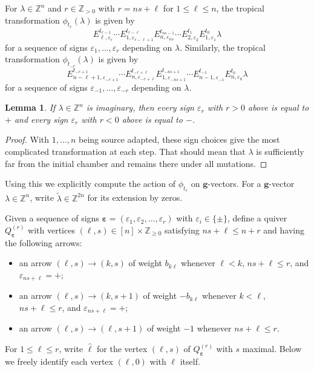 \documentclass{amsart}
\newtheorem{lemma}[theorem]{Lemma}
\numberwithin{theorem}{section}
\newcommand{\bfg}{\boldsymbol{g}}
\newcommand{\ZZ}{\mathbb{Z}}
\newcommand{\beps}{{\boldsymbol{\varepsilon}}}
\begin{document}
  For $\lambda\in\ZZ^n$ and $r\in\ZZ_{>0}$ with $r=ns+\ell$ for $1\le\ell\le n$, the tropical transformation $\phi_{t_r}(\lambda)$ is given by
  \[
    E^{t_{r-1}}_{\ell,\varepsilon_r} \cdots E^{t_{r-\ell}}_{1,\varepsilon_{r-\ell+1}} E^{t_{ns-1}}_{n,\varepsilon_{ns}} \cdots E^{t_1}_{2,\varepsilon_2} E^{t_0}_{1,\varepsilon_1} \lambda
  \]
  for a sequence of signs $\varepsilon_1,\ldots,\varepsilon_r$ depending on $\lambda$.
  Similarly, the tropical transformation $\phi_{t_{-r}}(\lambda)$ is given by
  \[
    E^{t_{-r+1}}_{n-\ell+1,\varepsilon_{-r+1}} \cdots E^{t_{-r+\ell}}_{n,\varepsilon_{-r+\ell}} E^{t_{-ns+1}}_{1,\varepsilon_{-ns+1}} \cdots E^{t_{-1}}_{n-1,\varepsilon_{-1}} E^{t_0}_{n,\varepsilon_0} \lambda
  \]
  for a sequence of signs $\varepsilon_{-1},\ldots,\varepsilon_{-r}$ depending on $\lambda$.
  \begin{lemma}
    \label{lem:imaginary mutations}
    If $\lambda\in\ZZ^n$ is imaginary, then every sign $\varepsilon_r$ with $r>0$ above is equal to $+$ and every sign $\varepsilon_r$ with $r<0$ above is equal to $-$.
  \end{lemma}
  \begin{proof}
    With $1,\ldots,n$ being source adapted, these sign choices give the most complicated transformation at each step.
    That should mean that $\lambda$ is sufficiently far from the initial chamber and remains there under all mutations.
  \end{proof}

  Using this we explicitly compute the action of $\phi_{t_r}$ on $\bfg$-vectors. 
  For a $\bfg$-vector $\lambda\in\ZZ^n$, write $\tilde\lambda\in\ZZ^{2n}$ for its extension by zeros.

  Given a sequence of signs $\beps=(\varepsilon_1,\varepsilon_2,\ldots,\varepsilon_r)$ with $\varepsilon_i\in\{\pm\}$, define a quiver $Q^{(r)}_\beps$ with vertices $(\ell,s)\in [n]\times\ZZ_{\ge0}$ satisfying $ns+\ell\le n+r$ and having the following arrows:
  \begin{itemize}
    \item an arrow $(\ell,s)\to (k,s)$ of weight $b_{k\ell}$ whenever $\ell<k$, $ns+\ell\le r$, and $\varepsilon_{ns+\ell}=+$;
    \item an arrow $(\ell,s)\to (k,s+1)$ of weight $-b_{k\ell}$ whenever $k<\ell$, $ns+\ell\le r$, and $\varepsilon_{ns+\ell}=+$;
    \item an arrow $(\ell,s)\to (\ell,s+1)$ of weight $-1$ whenever $ns+\ell\le r$.
  \end{itemize}
  For $1\le\ell\le r$, write $\hat{\ell}$ for the vertex $(\ell,s)$ of $Q^{(r)}_\beps$ with $s$ maximal.
  Below we freely identify each vertex $(\ell,0)$ with $\ell$ itself.
\end{document}
